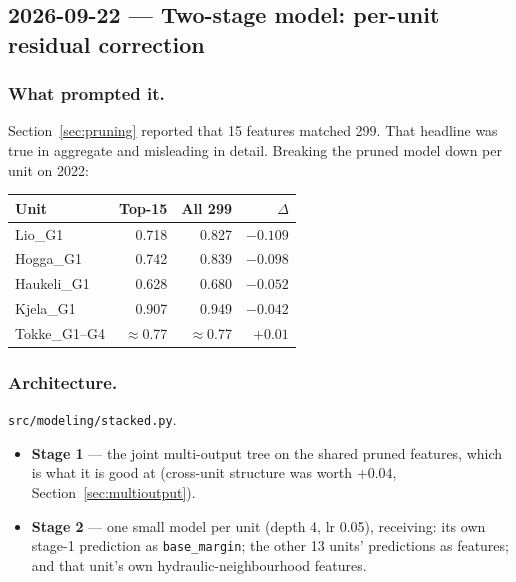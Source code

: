 \subsection{2026-09-22 --- Two-stage model: per-unit residual correction}
\label{sec:stacked}

\subsubsection*{What prompted it.}
Section~\ref{sec:pruning} reported that 15 features matched 299. That headline was true in
aggregate and misleading in detail. Breaking the pruned model down per unit on 2022:

\begin{center}
\begin{tabular}{lrrr}
\toprule
Unit & Top-15 & All 299 & $\Delta$ \\
\midrule
Lio\_G1     & 0.718 & 0.827 & $\mathbf{-0.109}$ \\
Hogga\_G1   & 0.742 & 0.839 & $\mathbf{-0.098}$ \\
Haukeli\_G1 & 0.628 & 0.680 & $-0.052$ \\
Kjela\_G1   & 0.907 & 0.949 & $-0.042$ \\
Tokke\_G1--G4 & $\approx$0.77 & $\approx$0.77 & $+0.01$ \\
\bottomrule
\end{tabular}
\end{center}


\subsubsection*{Architecture.} \texttt{src/modeling/stacked.py}.
\begin{itemize}\itemsep1pt
  \item \textbf{Stage 1} --- the joint multi-output tree on the shared pruned features, which is
        what it is good at (cross-unit structure was worth $+0.04$, Section~\ref{sec:multioutput}).
  \item \textbf{Stage 2} --- one small model per unit (depth 4, lr 0.05), receiving: its own
        stage-1 prediction as \texttt{base\_margin}; the other 13 units' predictions as features;
        and that unit's own hydraulic-neighbourhood features.
\end{itemize}

